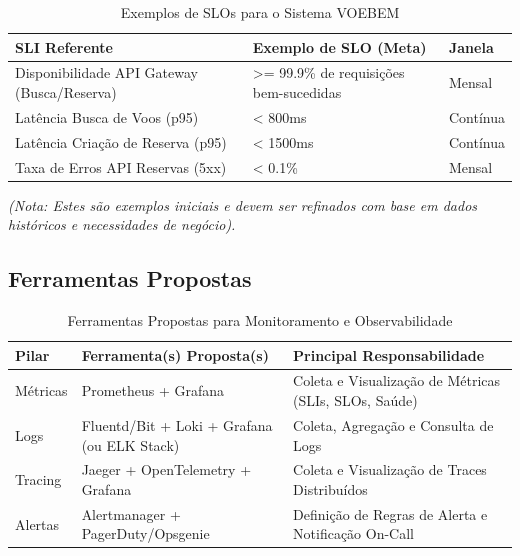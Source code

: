 \begin{table}[htbp]
    \centering
    \caption{Exemplos de SLOs para o Sistema VOEBEM}
    \label{tab:slos}
    \begin{tabularx}{\textwidth}{XXl} %
        \toprule
        \textbf{SLI Referente} & \textbf{Exemplo de SLO (Meta)} & \textbf{Janela} \\
        \midrule
        Disponibilidade API Gateway (Busca/Reserva) & >= 99.9\% de requisições bem-sucedidas & Mensal \\
        Latência Busca de Voos (p95) & < 800ms & Contínua \\
        Latência Criação de Reserva (p95) & < 1500ms & Contínua \\
        Taxa de Erros API Reservas (5xx) & < 0.1\% & Mensal \\
        \bottomrule
    \end{tabularx}
    \par\medskip
    \textit{(Nota: Estes são exemplos iniciais e devem ser refinados com base em dados históricos e necessidades de negócio).}
\end{table}

\subsection{Ferramentas Propostas}
\label{subsec:monitoramento-ferramentas}

\begin{table}[htbp]
    \centering
    \caption{Ferramentas Propostas para Monitoramento e Observabilidade}
    \label{tab:monitoramento-ferramentas}
    \begin{tabularx}{\textwidth}{lXX} %
        \toprule
        \textbf{Pilar} & \textbf{Ferramenta(s) Proposta(s)} & \textbf{Principal Responsabilidade} \\
        \midrule
        Métricas & Prometheus + Grafana & Coleta e Visualização de Métricas (SLIs, SLOs, Saúde) \\
        Logs & Fluentd/Bit + Loki + Grafana (ou ELK Stack) & Coleta, Agregação e Consulta de Logs \\
        Tracing & Jaeger + OpenTelemetry + Grafana & Coleta e Visualização de Traces Distribuídos \\
        Alertas & Alertmanager + PagerDuty/Opsgenie & Definição de Regras de Alerta e Notificação On-Call \\
        \bottomrule
    \end{tabularx}
\end{table}


